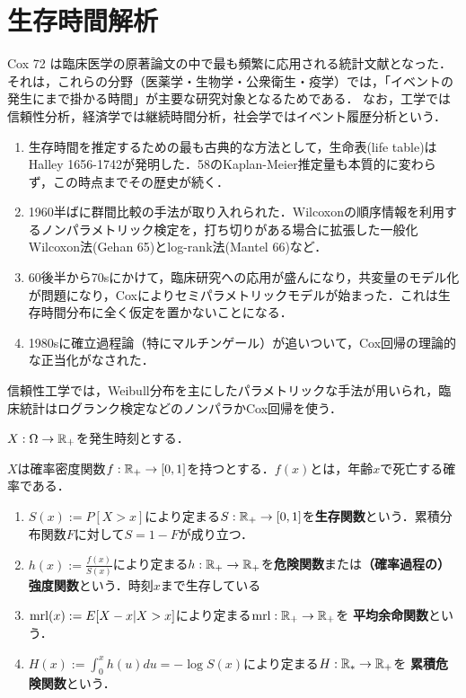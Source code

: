 \documentclass[uplatex,dvipdfmx]{jsreport}
\begin{document}
\section{生存時間解析}

\begin{tcolorbox}[colframe=ForestGreen, colback=ForestGreen!10!white,breakable,colbacktitle=ForestGreen!40!white,coltitle=black,fonttitle=\bfseries\sffamily,
title=]
    Cox 72 は臨床医学の原著論文の中で最も頻繁に応用される統計文献となった．
    それは，これらの分野（医薬学・生物学・公衆衛生・疫学）では，「イベントの発生にまで掛かる時間」が主要な研究対象となるためである．
    なお，工学では信頼性分析，経済学では継続時間分析，社会学ではイベント履歴分析という．
\end{tcolorbox}

\begin{history}\mbox{}
    \begin{enumerate}
        \item 生存時間を推定するための最も古典的な方法として，生命表(life table)はHalley 1656-1742が発明した．58のKaplan-Meier推定量も本質的に変わらず，この時点までその歴史が続く．
        \item 1960半ばに群間比較の手法が取り入れられた．Wilcoxonの順序情報を利用するノンパラメトリック検定を，打ち切りがある場合に拡張した一般化Wilcoxon法(Gehan 65)とlog-rank法(Mantel 66)など．
        \item 60後半から70sにかけて，臨床研究への応用が盛んになり，共変量のモデル化が問題になり，Coxによりセミパラメトリックモデルが始まった．これは生存時間分布に全く仮定を置かないことになる．
        \item 1980sに確立過程論（特にマルチンゲール）が追いついて，Cox回帰の理論的な正当化がなされた．
    \end{enumerate}
    信頼性工学では，Weibull分布を主にしたパラメトリックな手法が用いられ，臨床統計はログランク検定などのノンパラかCox回帰を使う．
\end{history}

\begin{notation}
    $X:\Omega\to\mathbb{R}_+$を発生時刻とする．
\end{notation}

\begin{definition}
    $X$は確率密度関数$f:\mathbb{R}_+\to[0,1]$を持つとする．$f(x)$とは，年齢$x$で死亡する確率である．
    \begin{enumerate}
        \item $S(x):=P[X>x]$により定まる$S:\mathbb{R}_+\to[0,1]$を\textbf{生存関数}という．累積分布関数$F$に対して$S=1-F$が成り立つ．
        \item $h(x):=\frac{f(x)}{S(x)}$により定まる$h:\mathbb{R}_+\to\mathbb{R}_+$を\textbf{危険関数}または\textbf{（確率過程の）強度関数}という．時刻$x$まで生存している
        \item $\mathrm{mrl}(x):=E[X-x|X>x]$により定まる$\mathrm{mrl}:\mathbb{R}_+\to\mathbb{R}_+$を
        \textbf{平均余命関数}という．
        \item $H(x):=\int^x_0h(u)du=-\log S(x)$により定まる$H:\mathbb{R}_*\to\mathbb{R}_+$を
        \textbf{累積危険関数}という．
    \end{enumerate}
\end{definition}
\end{document}
